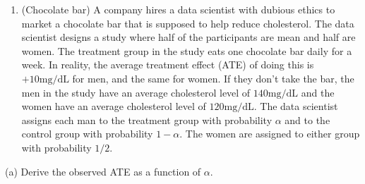 \documentclass[10pt]{article}
\begin{document}
\begin{enumerate}
  \item (Chocolate bar) A company hires a data scientist with dubious ethics to market a chocolate bar that is supposed to help reduce cholesterol. The data scientist designs a study where half of the participants are mean and half are women. The treatment group in the study eats one chocolate bar daily for a week. In reality, the average treatment effect (ATE) of doing this is $+10 \mathrm{mg} / \mathrm{dL}$ for men, and the same for women. If they don't take the bar, the men in the study have an average cholesterol level of $140 \mathrm{mg} / \mathrm{dL}$ and the women have an average cholesterol level of $120 \mathrm{mg} / \mathrm{dL}$. The data scientist assigns each man to the treatment group with probability $\alpha$ and to the control group with probability $1-\alpha$. The women are assigned to either group with probability $1 / 2$.

\end{enumerate}

(a) Derive the observed ATE as a function of $\alpha$.
\end{document}
